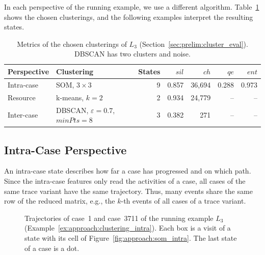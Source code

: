 In each perspective of the running example, we use a different algorithm. Table~\ref{tab:approach:cluster_eval} shows the chosen clusterings, and the following examples interpret the resulting states.

\begin{table}[tb]
	\centering
	\caption[Evaluation of the chosen clusterings of the running example]{%
		Metrics of the chosen clusterings of $L_3$ (Section~\ref{sec:prelim:cluster_eval}). DBSCAN has two clusters and noise.}
	\label{tab:approach:cluster_eval}
	\small
	\begin{tabular}{@{}llrrrrr@{}}
		\toprule
		Perspective & Clustering                                            & States & $\mathit{sil}$ & $\mathit{ch}$ & $\mathit{qe}$ & $\mathit{ent}$ \\
		\midrule
		Intra-case  & SOM, $3 \times 3$                                     & 9      & 0.857          & 36,694        & 0.288         & 0.973          \\
		Resource    & k-means, $k = 2$                                      & 2      & 0.934          & 24,779        & --            & --             \\
		Inter-case  & DBSCAN, $\varepsilon = 0.7$, $\mathit{minPts} = 8$    & 3      & 0.382          & 271           & --            & --             \\
		\bottomrule
	\end{tabular}
\end{table}

\subsection{Intra-Case Perspective}
\label{sec:approach:clustering:intra}
An intra-case state describes how far a case has progressed and on which path. Since the intra-case features only read the activities of a case, all cases of the same trace variant have the same trajectory. Thus, many events share the same row of the reduced matrix, e.g., the $k$-th events of all cases of a trace variant.

\begin{figure}[tb]
	\centering
	
	\caption[Intra-case trajectories of the running example]{%
		Trajectories of case~1 and case~3711 of the running example $L_3$ (Example~\ref{ex:approach:clustering_intra}). Each box is a visit of a state with its cell of Figure~\ref{fig:approach:som_intra}. The last state of a case is a dot.}
	\label{fig:approach:clustering_intra}
\end{figure}

